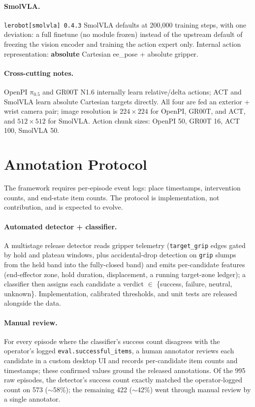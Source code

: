 \documentclass{article}
\begin{document}
\paragraph{SmolVLA.} \texttt{lerobot[smolvla] 0.4.3} SmolVLA defaults at 200{,}000 training steps, with one deviation: a full finetune (no module frozen) instead of the upstream default of freezing the vision encoder and training the action expert only. Internal action representation: \textbf{absolute} Cartesian ee\_pose + absolute gripper.

\paragraph{Cross-cutting notes.} OpenPI $\pi_{0.5}$ and GR00T N1.6 internally learn relative/delta actions; ACT and SmolVLA learn absolute Cartesian targets directly. All four are fed an exterior + wrist camera pair; image resolution is $224{\times}224$ for OpenPI, GR00T, and ACT, and $512{\times}512$ for SmolVLA. Action chunk sizes: OpenPI 50, GR00T 16, ACT 100, SmolVLA 50.

\section{Annotation Protocol}\label{app:protocol}

The framework requires per-episode event logs: place timestamps, intervention counts, and end-state item counts. The protocol is implementation, not contribution, and is expected to evolve.

\paragraph{Automated detector + classifier.} A multistage release detector reads gripper telemetry (\texttt{target\_grip} edges gated by hold and plateau windows, plus accidental-drop detection on \texttt{grip} slumps from the held band into the fully-closed band) and emits per-candidate features (end-effector zone, hold duration, displacement, a running target-zone ledger); a classifier then assigns each candidate a verdict $\in$ \{success, failure, neutral, unknown\}. Implementation, calibrated thresholds, and unit tests are released alongside the data.

\paragraph{Manual review.} For every episode where the classifier's success count disagrees with the operator's logged \texttt{eval.successful\_items}, a human annotator reviews each candidate in a custom desktop UI and records per-candidate item counts and timestamps; these confirmed values ground the released annotations. Of the 995 raw episodes, the detector's success count exactly matched the operator-logged count on 573 ($\sim$58\%); the remaining 422 ($\sim$42\%) went through manual review by a single annotator.
\end{document}
